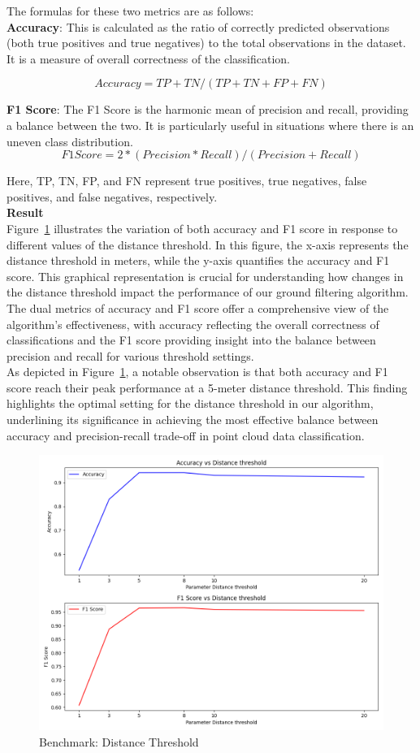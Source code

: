 \documentclass{article}
\begin{document}
\noindent The formulas for these two metrics are as follows:\\

\noindent \textbf{Accuracy}: This is calculated as the ratio of correctly predicted observations (both true positives and true negatives) to the total observations in the dataset. It is a measure of overall correctness of the classification.

\[Accuracy = TP+TN/(TP+TN+FP+FN)\]

\noindent \textbf{F1 Score}: The F1 Score is the harmonic mean of precision and recall, providing a balance between the two. It is particularly useful in situations where there is an uneven class distribution.\\

\[F1Score = 2*(Precision*Recall)/(Precision+Recall)\]

\noindent Here, TP, TN, FP, and FN represent true positives, true negatives, false positives, and false negatives, respectively.\\

\noindent \textbf{Result}\\
Figure~\ref{fig4} illustrates the variation of both accuracy and F1 score in response to different values of the distance threshold. In this figure, the x-axis represents the distance threshold in meters, while the y-axis quantifies the accuracy and F1 score. This graphical representation is crucial for understanding how changes in the distance threshold impact the performance of our ground filtering algorithm. The dual metrics of accuracy and F1 score offer a comprehensive view of the algorithm's effectiveness, with accuracy reflecting the overall correctness of classifications and the F1 score providing insight into the balance between precision and recall for various threshold settings.\\

\noindent As depicted in Figure~\ref{fig4}, a notable observation is that both accuracy and F1 score reach their peak performance at a 5-meter distance threshold. This finding highlights the optimal setting for the distance threshold in our algorithm, underlining its significance in achieving the most effective balance between accuracy and precision-recall trade-off in point cloud data classification.\\

\begin{figure}[hbt!]
    \centering
    \includegraphics[width=0.6\linewidth]{Figures/benchmark_Distance Threshold.png}
    \caption{Benchmark: Distance Threshold}
    \label{fig4}
\end{figure}
\end{document}
